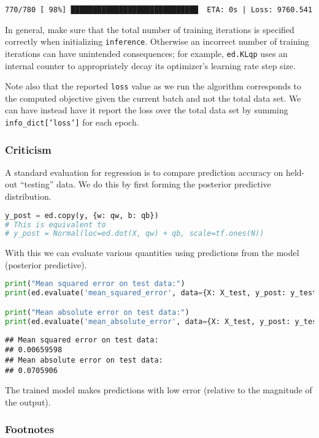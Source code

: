 \begin{lstlisting}
770/780 [ 98%] █████████████████████████████  ETA: 0s | Loss: 9760.541
\end{lstlisting}

In general, make sure that the total number of training iterations is
specified correctly when initializing \texttt{inference}. Otherwise an incorrect
number of training iterations can have unintended consequences; for example,
\texttt{ed.KLqp} uses an internal counter to appropriately decay its optimizer's
learning rate step size.

Note also that the reported \texttt{loss} value as we run the
algorithm corresponds to the computed objective given the current
batch and not the total data set. We can have instead have it report
the loss over the total data set by summing \texttt{info_dict['loss']}
for each epoch.

\subsubsection{Criticism}

A standard evaluation for regression is to compare prediction accuracy on
held-out ``testing'' data. We do this by first forming the posterior predictive
distribution.
\begin{lstlisting}[language=Python]
y_post = ed.copy(y, {w: qw, b: qb})
# This is equivalent to
# y_post = Normal(loc=ed.dot(X, qw) + qb, scale=tf.ones(N))
\end{lstlisting}

With this we can evaluate various quantities using predictions from
the model (posterior predictive).
\begin{lstlisting}[language=Python]
print("Mean squared error on test data:")
print(ed.evaluate('mean_squared_error', data={X: X_test, y_post: y_test}))

print("Mean absolute error on test data:")
print(ed.evaluate('mean_absolute_error', data={X: X_test, y_post: y_test}))
\end{lstlisting}

\begin{lstlisting}
## Mean squared error on test data:
## 0.00659598
## Mean absolute error on test data:
## 0.0705906
\end{lstlisting}

The trained model makes predictions with low error
(relative to the magnitude of the output).

\subsubsection{Footnotes}

